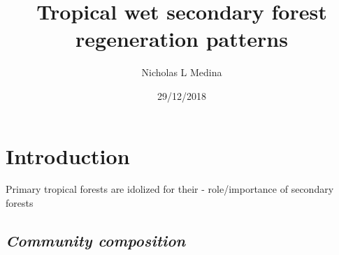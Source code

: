 \documentclass[]{article}
\title{Tropical wet secondary forest regeneration patterns}
\author{Nicholas L Medina}
\date{29/12/2018}
\begin{document}
\maketitle

\hypertarget{introduction}{%
\section{Introduction}\label{introduction}}

Primary tropical forests are idolized for their - role/importance of
secondary forests

\hypertarget{community-composition}{%
\subsection{\texorpdfstring{\emph{Community
composition}}{Community composition}}\label{community-composition}}
\end{document}
